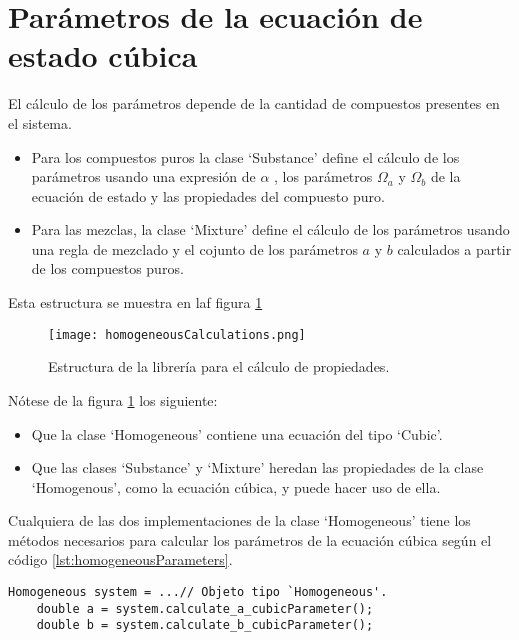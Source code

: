 \section{Parámetros de la ecuación de estado cúbica}

El cálculo de los parámetros depende de la cantidad de compuestos presentes en el sistema.

\begin{itemize}
 \item Para los compuestos puros la clase `Substance' define el cálculo de los parámetros usando una expresión de $\alpha$ , los parámetros $\Omega_a$ y $\Omega_b$ de la ecuación de estado y las propiedades del compuesto puro.
 \item Para las mezclas, la clase `Mixture' define el cálculo de los parámetros usando una regla de mezclado y el cojunto de los parámetros  $a$ y $b$ calculados a partir de los compuestos puros.
\end{itemize}




Esta estructura se muestra en laf figura \ref{fig:homogeneousCalculations}

\begin{figure}[!h]
  
  \centering
    \texttt{[image: homogeneousCalculations.png]}
    \caption{Estructura de la librería para el cálculo de propiedades.}
    \label{fig:homogeneousCalculations}
\end{figure}

Nótese de la figura \ref{fig:homogeneousCalculations} los siguiente:
\begin{itemize}
	\item Que la clase `Homogeneous' contiene una ecuación del tipo `Cubic'.
 	\item Que las clases `Substance' y `Mixture' heredan las propiedades de la clase `Homogenous', como la ecuación cúbica, y puede hacer uso de ella.

\end{itemize}

	Cualquiera de las dos implementaciones de la clase `Homogeneous' tiene los métodos necesarios para calcular los parámetros de la ecuación cúbica según el código \ref{lst:homogeneousParameters}.

\begin{lstlisting}[caption=Cualquier objeto tipo `Homogeneous' puede calcular los parámetros de la ecuación de estado cúbica a y b, label={lst:homogeneousParameters}]
	Homogeneous system = ...// Objeto tipo `Homogeneous'.
	double a = system.calculate_a_cubicParameter();
	double b = system.calculate_b_cubicParameter();
\end{lstlisting}


